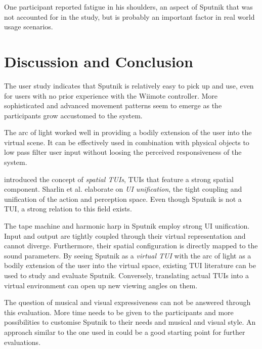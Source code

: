 \documentclass[10pt,a4paper]{scrartcl}
\begin{document}
One participant reported fatigue in his shoulders, an aspect of Sputnik that was not accounted for in the study, but is probably an important factor in real world usage scenarios.






\section{Discussion and Conclusion}
\label{sec:discussion}

The user study indicates that Sputnik is relatively easy to pick up and use, even for users with no prior experience with the Wiimote controller. More sophisticated and advanced movement patterns seem to emerge as the participants grow accustomed to the system.

The arc of light worked well in providing a bodily extension of the user into the virtual scene. It can be effectively used in combination with physical objects to low pass filter user input without loosing the perceived responsiveness of the system.


\cite{Sharlin2004} introduced the concept of \emph{spatial TUIs}, TUIs that feature a strong spatial component. Sharlin et al. elaborate on \emph{UI unification}, the tight coupling and unification of the action and perception space. Even though Sputnik is not a TUI, a strong relation to this field exists.

The tape machine and harmonic harp in Sputnik employ strong UI unification. Input and output are tightly coupled through their virtual representation and cannot diverge. Furthermore, their spatial configuration is directly mapped to the sound parameters. By seeing Sputnik as a \emph{virtual TUI} with the arc of light as a bodily extension of the user into the virtual space, existing TUI literature can be used to study and evaluate Sputnik. Conversely, translating actual TUIs into a virtual environment can open up new viewing angles on them.

	
The question of musical and visual expressiveness can not be answered through this evaluation. More time needs to be given to the participants and more possibilities to customise Sputnik to their needs and musical and visual style. An approach similar to the one used in \cite{Gurevich2010} could be a good starting point for further evaluations.
\end{document}
